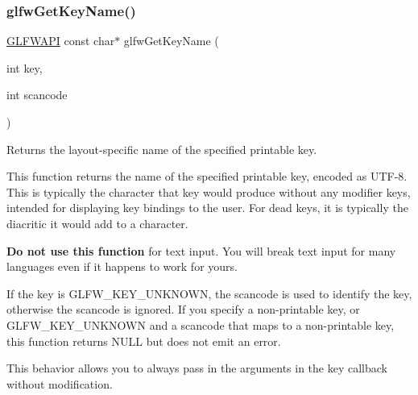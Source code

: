 \subsubsection{\texorpdfstring{glfwGetKeyName()}{glfwGetKeyName()}}
{\footnotesize\ttfamily \mbox{\hyperlink{glfw3_8h_a56da5036b2cc259351ae22fd6439bb47}{G\+L\+F\+W\+A\+PI}} const char$\ast$ glfw\+Get\+Key\+Name (\begin{DoxyParamCaption}\item[{int}]{key,  }\item[{int}]{scancode }\end{DoxyParamCaption})}



Returns the layout-\/specific name of the specified printable key. 

This function returns the name of the specified printable key, encoded as U\+T\+F-\/8. This is typically the character that key would produce without any modifier keys, intended for displaying key bindings to the user. For dead keys, it is typically the diacritic it would add to a character.

{\bfseries{Do not use this function}} for text input. You will break text input for many languages even if it happens to work for yours.

If the key is {\ttfamily G\+L\+F\+W\+\_\+\+K\+E\+Y\+\_\+\+U\+N\+K\+N\+O\+WN}, the scancode is used to identify the key, otherwise the scancode is ignored. If you specify a non-\/printable key, or {\ttfamily G\+L\+F\+W\+\_\+\+K\+E\+Y\+\_\+\+U\+N\+K\+N\+O\+WN} and a scancode that maps to a non-\/printable key, this function returns {\ttfamily N\+U\+LL} but does not emit an error.

This behavior allows you to always pass in the arguments in the key callback without modification.

